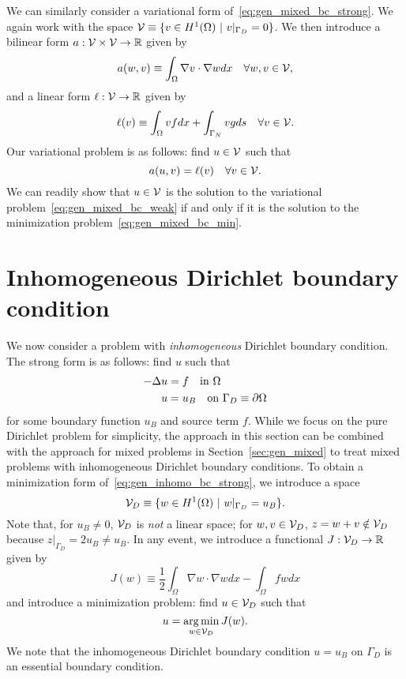 We can similarly consider a variational form of~\eqref{eq:gen_mixed_bc_strong}. We again work with the space $\mathcal{V} \equiv \{ v \in H^1(\Omega) \ | \ v|_{\Gamma_D} = 0 \}$. We then introduce a bilinear form $a: \mathcal{V} \times \mathcal{V} \to \mathbb{R}$ given by
\begin{equation*}
  a(w,v) \equiv \int_\Omega \nabla v \cdot \nabla w dx \quad \forall w,v \in \mathcal{V},
\end{equation*}
and a linear form $\ell: \mathcal{V} \to \mathbb{R}$ given by
\begin{equation*}
  \ell(v) \equiv \int_\Omega v f dx + \int_{\Gamma_N} v g ds \quad \forall v \in \mathcal{V}.
\end{equation*}
Our variational problem is as follows: find $u \in \mathcal{V}$ such that
\begin{equation}
  a(u,v) = \ell(v) \quad \forall v \in \mathcal{V}. \label{eq:gen_mixed_bc_weak}
\end{equation}
We can readily show that $u \in \mathcal{V}$ is the solution to the variational problem~\eqref{eq:gen_mixed_bc_weak} if and only if it is the solution to the minimization problem~\eqref{eq:gen_mixed_bc_min}.

\section{Inhomogeneous Dirichlet boundary condition}
We now consider a problem with \emph{inhomogeneous} Dirichlet boundary condition.  The strong form is as follows: find $u$ such that
\begin{align}
  -\Delta u &= f \quad \text{in } \Omega \label{eq:gen_inhomo_bc_strong} \\
  u &= u_B \quad \text{on } \Gamma_D \equiv \partial \Omega \notag
\end{align}
for some boundary function $u_B$ and source term $f$. While we focus on the pure Dirichlet problem for simplicity, the approach in this section can be combined with the approach for mixed problems in Section~\ref{sec:gen_mixed} to treat mixed problems with inhomogeneous Dirichlet boundary conditions.
To obtain a minimization form of~\eqref{eq:gen_inhomo_bc_strong}, we introduce a space
\begin{equation*}
  \mathcal{V}_D \equiv \{ w \in H^1(\Omega) \ | \ w|_{\Gamma_D} = u_B \}.
\end{equation*}
Note that, for $u_B \neq 0$, $\mathcal{V}_D$ is \emph{not} a linear space; for $w,v \in \mathcal{V}_D$, $z = w + v \notin \mathcal{V}_D$ because $z|_{\Gamma_D} = 2 u_B \neq u_B$. In any event, we introduce a functional $J: \mathcal{V}_D \to \mathbb{R}$ given by
\begin{equation}
  J(w) \equiv \frac{1}{2} \int_{\Omega} \nabla w \cdot \nabla w dx - \int_\Omega f w dx
  \label{eq:gen_inhomo_bc_min_func}
\end{equation}
and introduce a minimization problem: find $u \in \mathcal{V}_D$ such that
\begin{equation}
  u = \operatorname*{arg\,min}_{w \in \mathcal{V}_D} J(w).
  \label{eq:gen_inhomo_bc_min}
\end{equation}
We note that the inhomogeneous Dirichlet boundary condition $u = u_B$ on $\Gamma_D$ is an essential boundary condition.

